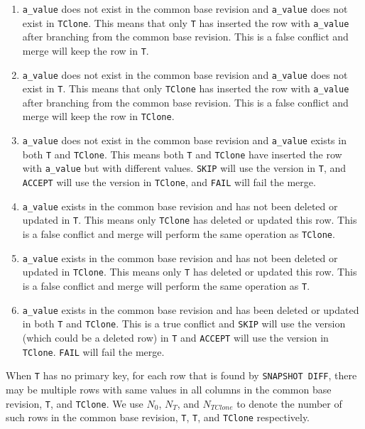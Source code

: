 \documentclass[sigconf,nonacm]{acmart} %
\begin{document}
\begin{enumerate}
\item \texttt{a\_value} does not exist in the common base revision 
and \texttt{a\_value} does not exist in \texttt{TClone}.
This means that only \texttt{T} has inserted the row with \texttt{a\_value} 
after branching from the common base revision.  This is a false conflict and 
merge will keep the row in \texttt{T}.

\item \texttt{a\_value} does not exist in the common base revision 
and \texttt{a\_value} does not exist in \texttt{T}.
This means that only \texttt{TClone} has inserted the row with \texttt{a\_value} 
after branching from the common base revision.  This is a false conflict and 
merge will keep the row in \texttt{TClone}.

\item \texttt{a\_value} does not exist in the common base revision and 
\texttt{a\_value} exists in both \texttt{T} and \texttt{TClone}.  
This means both \texttt{T} and \texttt{TClone} have inserted the row 
with \texttt{a\_value} but with different values.  \texttt{SKIP} will 
use the version in \texttt{T}, and \texttt{ACCEPT} will use the 
version in \texttt{TClone}, and \texttt{FAIL} will fail the merge.

\item \texttt{a\_value} exists in the common base revision and has not been deleted or updated
in \texttt{T}. This means only \texttt{TClone} has deleted or updated 
this row.  This is a false conflict and merge will perform the 
same operation as \texttt{TClone}.

\item \texttt{a\_value} exists in the common base revision and has not been deleted or updated
in \texttt{TClone}. This means only \texttt{T} has deleted or updated 
this row.  This is a false conflict and merge will perform the 
same operation as \texttt{T}.

\item \texttt{a\_value} exists in the common base revision and has been deleted or updated
in both \texttt{T} and \texttt{TClone}.  This is a true conflict and 
\texttt{SKIP} will use the version (which could be a deleted row) in \texttt{T} 
and \texttt{ACCEPT} will use the version in \texttt{TClone}.  \texttt{FAIL} 
will fail the merge.
\end{enumerate}
When \texttt{T} has no primary key, for each row that is found by \texttt{SNAPSHOT DIFF}, 
there may be multiple rows with same values in all columns in the common base revision, \texttt{T},
and \texttt{TClone}.  We use $N_0$, $N_T$, and $N_{TClone}$ to denote the number of such rows 
in the common base revision, \texttt{T}, \texttt{T}, and \texttt{TClone} respectively.
\end{document}
